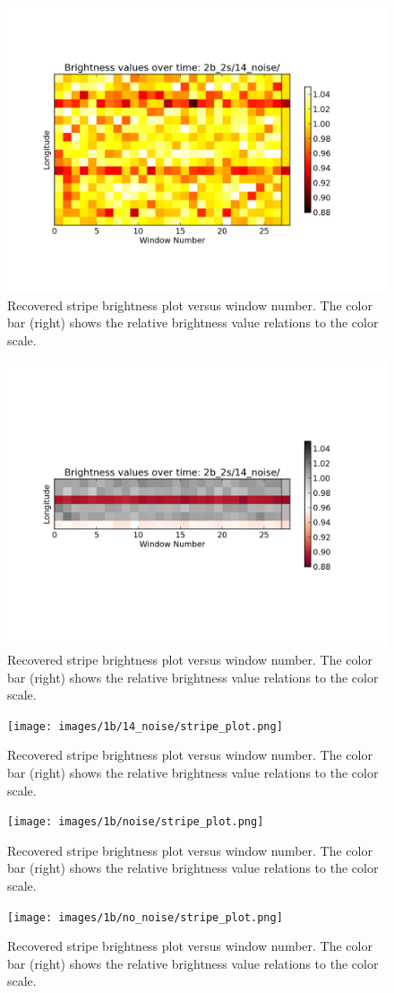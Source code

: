 \begin{figure}[h]
	\centering
	\includegraphics[width=.5\textwidth]{images/2b_2s/14_noise/box_plot.png}
	\caption{Recovered stripe brightness plot versus window number. The color bar (right) shows the relative brightness value relations to the color scale.}
	\label{box_plot}
\end{figure}
\begin{figure}[h]
	\centering
	\includegraphics[width=.5\textwidth]{images/2b_2s/14_noise/stripe_plot.png}
	\caption{Recovered stripe brightness plot versus window number. The color bar (right) shows the relative brightness value relations to the color scale.}
	\label{stripe_plot}
\end{figure}
\begin{figure}[h]
	\centering
	\texttt{[image: images/1b/14\_noise/stripe\_plot.png]}
	\caption{Recovered stripe brightness plot versus window number. The color bar (right) shows the relative brightness value relations to the color scale.}
	\label{stripe_plot14}
\end{figure}
\begin{figure}[h]
	\centering
	\texttt{[image: images/1b/noise/stripe\_plot.png]}
	\caption{Recovered stripe brightness plot versus window number. The color bar (right) shows the relative brightness value relations to the color scale.}
	\label{stripe_plot12}
\end{figure}
\begin{figure}[h]
	\centering
	\texttt{[image: images/1b/no\_noise/stripe\_plot.png]}
	\caption{Recovered stripe brightness plot versus window number. The color bar (right) shows the relative brightness value relations to the color scale.}
	\label{stripe_plot}
\end{figure}
